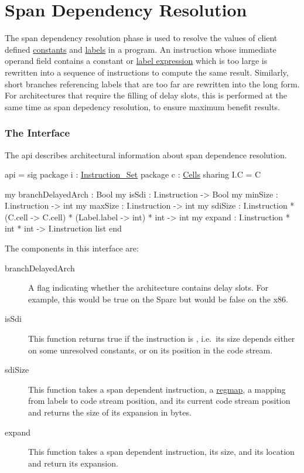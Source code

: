 \section{Span Dependency Resolution} \label{sec:span-dep}

The span dependency resolution phase is used to resolve the values of
client defined \href{constants.html}{constants} and \href{labels.html}{labels}
in a program.  An instruction whose immediate operand field contains a
constant or \href{labexp.html}{label expression} which
is too large is rewritten into a sequence of instructions to compute
the same result.  Similarly, short branches referencing labels that are 
too far are rewritten into the long form.   For architectures
that require the filling of delay slots, this is performed at the same
time as span depedency resolution, to ensure maximum benefit results.

\subsubsection{The Interface}

The api  describes
architectural information about span dependence resolution.

\begin{SML}
api  = sig
  package i : \href{instructions.html}{Instruction_Set}
  package c : \href{cells.html}{Cells}
    sharing I.C = C

  my branchDelayedArch : Bool
  my isSdi : I.instruction -> Bool
  my minSize : I.instruction -> int
  my maxSize : I.instruction -> int
  my sdiSize : I.instruction * (C.cell -> C.cell)
                              * (Label.label -> int) * int -> int
  my expand : I.instruction * int * int -> I.instruction list
end
\end{SML}

The components in this interface are:
\begin{description}
  \item[branchDelayedArch] A flag indicating whether the architecture
contains delay slots.  For example, this would be true on the 
Sparc but would be false on the x86.
   \item[isSdi] This function returns true if the instruction is 
, i.e.~its size depends either on some unresolved
constants, or on its position in the code stream.
   \item[sdiSize]  This function takes a span dependent instruction, 
a \href{regmap.html}{regmap},
a mapping from labels to code stream position, and 
its current code stream position and returns the size of its
expansion in bytes.
   \item[expand] This function takes a span dependent instruction,
its size, and its location and return its expansion.
\end{description}

